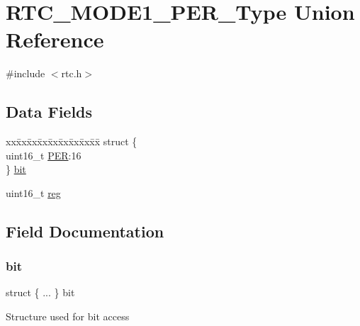 \hypertarget{union_r_t_c___m_o_d_e1___p_e_r___type}{}\section{R\+T\+C\+\_\+\+M\+O\+D\+E1\+\_\+\+P\+E\+R\+\_\+\+Type Union Reference}
\label{union_r_t_c___m_o_d_e1___p_e_r___type}


{\ttfamily \#include $<$rtc.\+h$>$}

\subsection*{Data Fields}
\begin{DoxyCompactItemize}
\item 
\begin{tabbing}
xx\=xx\=xx\=xx\=xx\=xx\=xx\=xx\=xx\=\kill
struct \{\\
\>uint16\_t \mbox{\hyperlink{union_r_t_c___m_o_d_e1___p_e_r___type_ac11d9bea710c188080b333ec5a1239d1}{PER}}:16\\
\} \mbox{\hyperlink{union_r_t_c___m_o_d_e1___p_e_r___type_a2353ea479f07e92feca25887ef63c803}{bit}}\\

\end{tabbing}\item 
uint16\+\_\+t \mbox{\hyperlink{union_r_t_c___m_o_d_e1___p_e_r___type_a11760f5020019f4aa8cb02e694f7cc44}{reg}}
\end{DoxyCompactItemize}


\subsection{Field Documentation}
\mbox{\label{union_r_t_c___m_o_d_e1___p_e_r___type_a2353ea479f07e92feca25887ef63c803}} 
\subsubsection{\texorpdfstring{bit}{bit}}
{\footnotesize\ttfamily struct \{ ... \}   bit}

Structure used for bit access \mbox{\label{union_r_t_c___m_o_d_e1___p_e_r___type_ac11d9bea710c188080b333ec5a1239d1}} 
